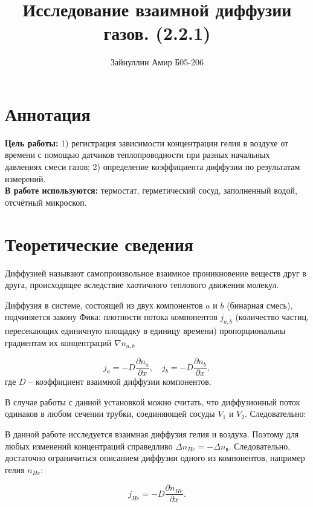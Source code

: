 \documentclass[a4paper,12pt]{article}
\begin{document}
	

	\title{\textbf{Исследование взаимной диффузии газов. (2.2.1)}}
	\author{Зайнуллин Амир Б05-206}

	\maketitle

	\section{Аннотация}
	
	\textbf{Цель работы:} 1) регистрация зависимости концентрации гелия в воздухе от времени с помощью датчиков теплопроводности при разных начальных давлениях смеси газов; 
    2) определение коэффициента диффузии по результатам измерений. \\
	\textbf{В работе используются:} термостат, герметический сосуд, заполненный водой, отсчётный микроскоп.
	
	
	\section{Теоретические сведения}
	
	Диффузией называют самопроизвольное взаимное проникновение веществ друг в друга, происходящее вследствие хаотичного теплового движения молекул.
	
	Диффузия в системе, состоящей из двух компонентов $ a $ и $ b $ (бинарная смесь), подчиняется закону Фика: плотности потока компонентов $ j_{a,b} $ (количество частиц, пересекающих единичную площадку в единицу времени) пропорциональны градиентам их концентраций $ \nabla n_{a,b}$
	
	\[ j_a = -D\dfrac{\partial n_a}{\partial x}, \quad j_b = -D\dfrac{\partial n_b}{\partial x}, \]
	где $ D $ -- коэффициент взаимной диффузии компонентов.
	
	В случае работы с данной установкой можно считать, что диффузионный поток одинаков в любом сечении трубки, соединяющей сосуды $V_1$ и $V_2$. Следовательно:
	
	В данной работе исследуется взаимная диффузия гелия и воздуха. Поэтому для любых изменений концентраций справедливо $ \Delta n_{He}=-\Delta n_{\text{в}} $. Следовательно, достаточно ограничиться описанием диффузии одного из компонентов, например гелия $ n_{He} $:
	
	\begin{equation}
		j_{He}=-D\dfrac{\partial 	n_{He}}{\partial x}.
	\end{equation}
	
\end{document}
